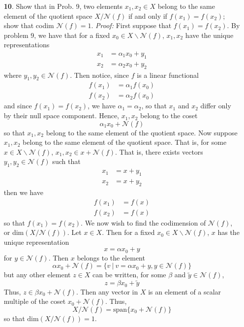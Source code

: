 \documentclass{article}
\begin{document}
\begin{itemize}
    \item[\textbf{10}.] Show that in Prob. 9, two elements $x_1, x_2 \in X$ belong to the same element of the quotient space $X/\mathcal{N}(f)$ if and only if $f(x_1) = f(x_2)$; show that codim $\mathcal{N}(f) = 1$.
    \newline\newline
    \textit{Proof:} First suppose that $f(x_1) = f(x_2)$. By problem 9, we have that for a fixed $x_0 \in X\backslash \mathcal{N}(f)$, $x_1,x_2$ have the unique representations
    \begin{align*}
        x_1 &= \alpha_1x_0 + y_1\\
        x_2 &= \alpha_2x_0 + y_2
    \end{align*}
    where $y_1,y_2 \in \mathcal{N}(f)$. Then notice, since $f$ is a linear functional
    \begin{align*}
        f(x_1) &= \alpha_1f(x_0)\\
        f(x_2) &= \alpha_2f(x_0)
    \end{align*}
    and since $f(x_1) = f(x_2)$, we have $\alpha_1 = \alpha_2$, so that $x_1$ and $x_2$ differ only by their null space component. Hence, $x_1,x_2$ belong to the coset
    \[\alpha_1x_0 + \mathcal{N}(f) \]
    so that $x_1,x_2$ belong to the same element of the quotient space. Now suppose $x_1,x_2$ belong to the same element of the quotient space. That is, for some $x \in X\backslash \mathcal{N}(f)$, $x_1,x_2 \in x + \mathcal{N}(f)$. That is, there exists vectors $y_1,y_2 \in \mathcal{N}(f)$ such that
    \begin{align*}
        x_1 &= x + y_1\\
        x_2 &= x + y_2
    \end{align*}
    then we have
    \begin{align*}
        f(x_1) &= f(x)\\
        f(x_2) &= f(x)
    \end{align*}
    so that $f(x_1) = f(x_2)$. 
    \newline\newline
    We now wish to find the codimension of $\mathcal{N}(f)$, or dim$(X/\mathcal{N}(f))$. Let $x \in X$. Then for a fixed $x_0 \in X\backslash\mathcal{N}(f)$, $x$ has the unique representation
    \[x = \alpha x_0 + y\]
    for $y \in \mathcal{N}(f)$. Then $x$ belongs to the element
    \[\alpha x_0 + \mathcal{N}(f) = \{v \:|\: v = \alpha x_0 + y, y \in \mathcal{N}(f)\}\]
    but any other element $z \in X$ can be written, for some $\beta$ and $\tilde{y} \in \mathcal{N}(f)$,
    \[z = \beta x_0 + \tilde{y}\]
    Thus, $z \in \beta x_0 + \mathcal{N}(f)$. Then any vector in $X$ is an element of a scalar multiple of the coset $x_0 + \mathcal{N}(f)$. Thus, 
    \[X/\mathcal{N}(f) = \text{span}\{x_0 + \mathcal{N}(f)\}\]
    so that $\text{dim}(X/\mathcal{N}(f)) = 1$.
\end{itemize}
\end{document}
